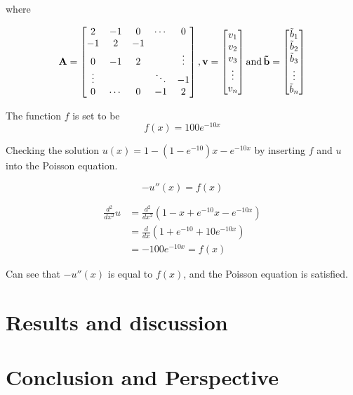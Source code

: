 \documentclass[%
oneside,                 %
final,                   %
10pt]{article}
\begin{document}
where

\begin{equation*}
\mathbf{A}=\begin{bmatrix}
2 & -1 & 0 & \cdots & 0\\
-1 & 2 & -1 & & \\
0 & -1 & 2 & & \vdots \\
\vdots & & & \ddots &-1\\
0 & \cdots & 0 & -1 & 2
\end{bmatrix},
\mathbf{v}=
\begin{bmatrix}
v_1\\
v_2\\
v_3\\
\vdots\\
v_n
\end{bmatrix} \textnormal{and}\,
\mathbf{\tilde{b}}=\begin{bmatrix}
\tilde{b}_1\\
\tilde{b}_2\\
\tilde{b}_3\\
\vdots\\
\tilde{b}_n\\
\end{bmatrix}
\end{equation*}

\vskip0.7cm
The function $f$ is set to be
$$f(x)=100e^{-10x}$$

Checking the solution $u(x)=1-(1-e^{-10})x-e^{-10x}$ by inserting $f$ and $u$ into the Poisson equation.

$$-u''(x)=f(x)$$

\begin{equation*}
\begin{split}
\frac{d^2}{dx^2}u&=\frac{d^2}{dx^2}(1-x+e^{-10}x-e^{-10x})\\
&=\frac{d}{dx}(1+e^{-10}+10e^{-10x})\\
&=-100e^{-10x} = f(x)
\end{split}
\end{equation*}

Can see that $-u''(x)$ is equal to $f(x)$, and the Poisson equation is satisfied.



\section{Results and discussion}

\section{Conclusion and Perspective}
\end{document}
